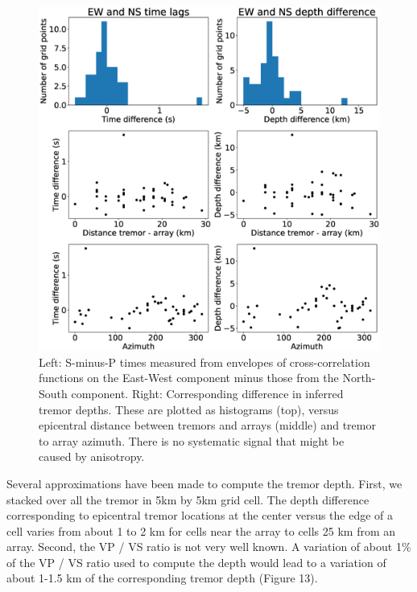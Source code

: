 \documentclass[draft]{agujournal2019}
\begin{document}
\begin{figure}
\noindent\includegraphics[width=\textwidth, trim={0cm 0cm 0cm 0cm},clip]{figures/PWS_PWS_0.eps}
\caption{Left: S-minus-P times measured from envelopes of cross-correlation functions on the East-West component minus those from the North-South component. Right: Corresponding difference in inferred tremor depths.  These are plotted as histograms (top), versus epicentral distance between tremors and arrays (middle) and tremor to array azimuth. There is no systematic signal that might be caused by anisotropy.}
\label{pngfiguresample}
\end{figure}

Several approximations have been made to compute the tremor depth. First, we stacked over all the tremor in 5km by 5km grid cell. The depth difference corresponding to epicentral tremor locations at the center versus the edge of a cell varies from about 1 to 2 km for cells near the array to cells 25 km from an array. Second, the VP / VS ratio is not very well known. A variation of about 1\% of the VP / VS ratio used to compute the depth  would lead to a variation of about 1-1.5 km of the corresponding tremor depth (Figure 13).
\end{document}
